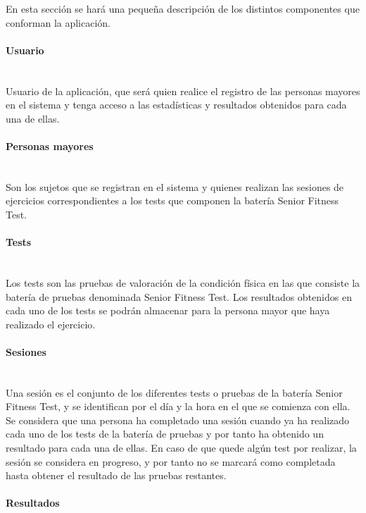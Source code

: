 En esta sección se hará una pequeña descripción de los distintos componentes que conforman la aplicación.

\paragraph{Usuario}\mbox{}\\

Usuario de la aplicación, que será quien realice el registro de las personas mayores en el sistema y tenga acceso a las estadísticas y resultados obtenidos para cada una de ellas.\\

\paragraph{Personas mayores}\mbox{}\\

Son los sujetos que se registran en el sistema y quienes realizan las sesiones de ejercicios correspondientes a los tests que componen la batería Senior Fitness Test.

\paragraph{Tests}\mbox{}\\

Los tests son las pruebas de valoración de la condición física en las que consiste la batería de pruebas denominada Senior Fitness Test. Los resultados obtenidos en cada uno de los tests se podrán almacenar para la persona mayor que haya realizado el ejercicio.

\paragraph{Sesiones}\mbox{}\\

Una sesión es el conjunto de los diferentes tests o pruebas de la batería Senior Fitness Test, y se identifican por el día y la hora en el que se comienza con ella. Se considera que una persona ha completado una sesión cuando ya ha realizado cada uno de los tests de la batería de pruebas y por tanto ha obtenido un resultado para cada una de ellas. En caso de que quede algún test por realizar, la sesión se considera en progreso, y por tanto no se marcará como completada hasta obtener el resultado de las pruebas restantes.

\paragraph{Resultados}\mbox{}\\

